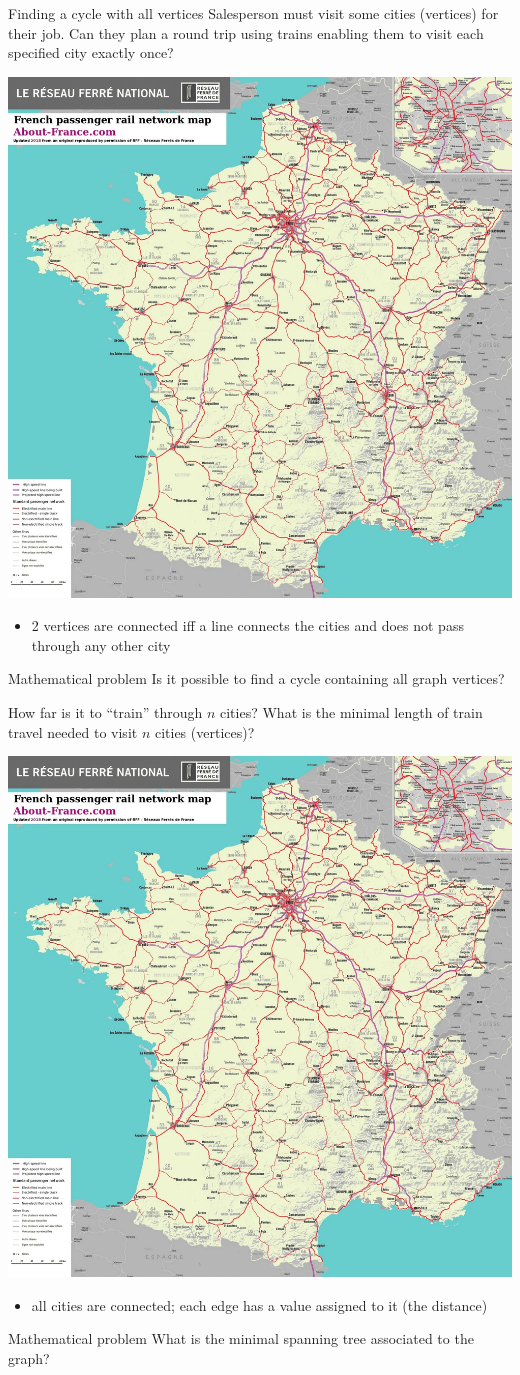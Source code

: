 \documentclass[aspectratio=169]{beamer}\usepackage[]{graphicx}\usepackage[]{xcolor}
\begin{document}
\begin{frame}{Finding a cycle with all vertices}
Salesperson must visit some cities (vertices) for their job. Can they plan a round trip using trains enabling them to visit each specified city exactly once?
	\begin{center}
	\includegraphics[width=.25\textwidth]{FIGS/RFF-map}
	\end{center}
	\begin{itemize}
	\item 2 vertices are connected iff a line connects the cities and does not pass through any other city
	\end{itemize}
	\begin{block}{Mathematical problem}
	Is it possible to find a cycle containing all graph vertices?
	\end{block}
\end{frame}

\begin{frame}{How far is it to ``train'' through $n$ cities?}
	What is the minimal length of train travel needed to visit $n$ cities (vertices)?
	\begin{center}
	\includegraphics[width=.3\textwidth]{FIGS/RFF-map}
	\end{center}
	\begin{itemize}
	\item all cities are connected; each edge has a value assigned to it (the distance)
	\end{itemize}
	\begin{block}{Mathematical problem}
	What is the minimal spanning tree associated to the graph?
	\end{block}
\end{frame}
\end{document}
